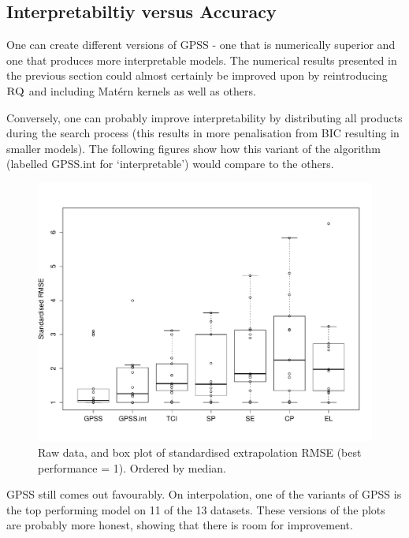 \documentclass{article}
\begin{document}
\subsection{Interpretabiltiy versus Accuracy}

One can create different versions of GPSS - one that is numerically superior and one that produces more interpretable models.
The numerical results presented in the previous section could almost certainly be improved upon by reintroducing ${\textsc{RQ}}$ and including Mat\'ern kernels as well as others.

Conversely, one can probably improve interpretability by distributing all products during the search process (this results in more penalisation from BIC resulting in smaller models).
The following figures show how this variant of the algorithm (labelled GPSS.int for `interpretable') would compare to the others.



\begin{figure}[h]
\centering
\includegraphics[width=\columnwidth]{figures/box_extrap_dist}
\caption{
Raw data, and box plot of standardised extrapolation RMSE (best performance = 1).
Ordered by median.
}
\label{fig:box_extrap_dist}
\end{figure}

GPSS still comes out favourably.
On interpolation, one of the variants of GPSS is the top performing model on 11 of the 13 datasets.
These versions of the plots are probably more honest, showing that there is room for improvement.
\end{document}
